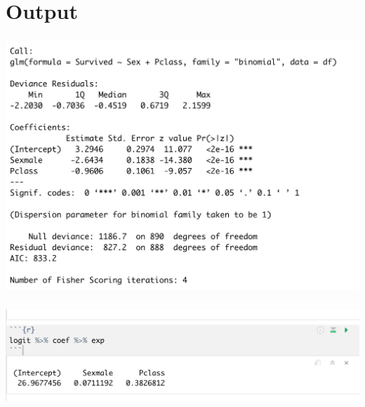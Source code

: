 \documentclass[t, 11pt]{beamer}
\begin{document}
\section{Output}
\begin{frame} 
	\frametitle{\insertsection} 
	
	\begin{center}
		\includegraphics[scale=0.4]{logit1}
	\end{center}
	
\end{frame}	

\begin{frame} 
	\frametitle{\insertsection} 
	
	\begin{center}
		\includegraphics[scale=0.4]{logit2}
	\end{center}
	
\end{frame}	
\end{document}
